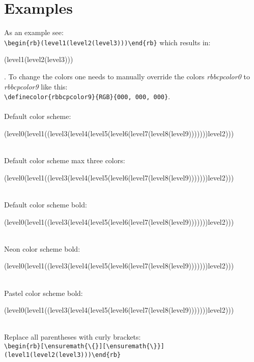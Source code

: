 \documentclass[10pt, a4paper]{article}
\begin{document}
	\section{Examples}\label{sec:examples}
	As an example see: \\\verb=\begin{rb}(level1(level2(level3)))\end{rb}= which results in: \begin{rb}(level1(level2(level3)))\end{rb}.
	To change the colors one needs to manually override the colors \textit{rbbcpcolor0} to \textit{rbbcpcolor9} like this: \\\verb=\definecolor{rbbcpcolor9}{RGB}{000, 000, 000}=.
	\\\ \\Default color scheme: \\\begin{rb}(level0(level1((level3(level4(level5(level6(level7(level8(level9)))))))level2)))\end{rb}
	\\Default color scheme max three colors: \\\begin{rb}(level0(level1((level3(level4(level5(level6(level7(level8(level9)))))))level2)))\end{rb}
	\rbresetbracketmax
	\\Default color scheme bold: 
	\\\begin{rbb}(level0(level1((level3(level4(level5(level6(level7(level8(level9)))))))level2)))\end{rbb}
	\\Neon color scheme bold: 
	\\\begin{rbb}(level0(level1((level3(level4(level5(level6(level7(level8(level9)))))))level2)))\end{rbb}
	\\Pastel color scheme bold: 
	\\\begin{rbb}(level0(level1((level3(level4(level5(level6(level7(level8(level9)))))))level2)))\end{rbb}
	\rbresetstyle
	\\Replace all parentheses with curly brackets: \\\verb=\begin{rb}[\ensuremath{\{}][\ensuremath{\}}](level1(level2(level3)))\end{rb}=
\end{document}
